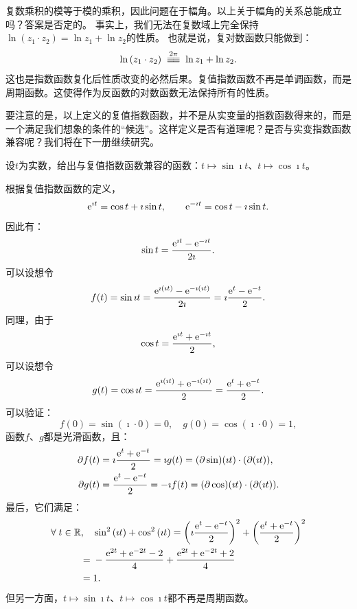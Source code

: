 \documentclass[12pt,UTF8,fontset=none]{ctexbook}
\begin{document}
复数乘积的模等于模的乘积，因此问题在于幅角。以上关于幅角的关系总能成立吗？答案是否定的。
事实上，我们无法在复数域上完全保持$\ln{(z_1 \cdot z_2)} = \ln{z_1} + \ln{z_2}$的性质。
也就是说，复对数函数只能做到：
$$ \ln{(z_1 \cdot z_2)} \tong{2\pi} \ln{z_1} + \ln{z_2} . $$
这也是指数函数复化后性质改变的必然后果。复值指数函数不再是单调函数，而是周期函数。这使得作为反函数的对数函数无法保持所有的性质。

要注意的是，以上定义的复值指数函数，并不是从实变量的指数函数得来的，而是一个满足我们想象的条件的“候选”。这样定义是否有道理呢？是否与实变指数函数兼容呢？我们将在下一册继续研究。

\begin{et}
    设$t$为实数，给出与复值指数函数兼容的函数：$t\mapsto \sin{\imath t}$、$t\mapsto \cos{\imath t}$。
\end{et}

\begin{so}
    根据复值指数函数的定义，
    $$ \mathrm{e}^{\imath t} = \cos{t} + \imath \sin{t}, \qquad \mathrm{e}^{-\imath t} = \cos{t} - \imath \sin{t}. $$
    因此有：
    $$ \sin{t} = \frac{\mathrm{e}^{\imath t} - \mathrm{e}^{-\imath t}}{2\imath}.$$
    可以设想令
    $$ f(t) = \sin{\imath t} = \frac{\mathrm{e}^{\imath (\imath t)} - \mathrm{e}^{-\imath (\imath t)}}{2\imath} = \imath \frac{\mathrm{e}^{t} - \mathrm{e}^{-t}}{2}.$$
    同理，由于
    $$ \cos{t} = \frac{\mathrm{e}^{\imath t} + \mathrm{e}^{-\imath t}}{2},$$
    可以设想令
    $$ g(t) = \cos{\imath t} = \frac{\mathrm{e}^{\imath (\imath t)} + \mathrm{e}^{-\imath (\imath t)}}{2} = \frac{\mathrm{e}^{t} + \mathrm{e}^{-t}}{2}.$$
    可以验证：
    $$ f(0) = \sin{(\imath \cdot 0)} = 0, \quad g(0)=\cos{(\imath \cdot 0)} = 1,$$
    函数$f$、$g$都是光滑函数，且：
    \begin{align*}
        \partial f(t) &= \imath \frac{\mathrm{e}^{t} + \mathrm{e}^{-t}}{2} = \imath g(t) = (\partial\sin)(\imath t)\cdot (\partial(\imath t)), \\
        \partial g(t) &= \frac{\mathrm{e}^{t} - \mathrm{e}^{-t}}{2} = -\imath f(t) = (\partial\cos)(\imath t)\cdot (\partial(\imath t)).
    \end{align*}
    最后，它们满足：
    \begin{align*}
        \forall \; t\in \mathbb{R}, \quad & \sin^2{(\imath t)} + \cos^2{(\imath t)} = \left(\imath \frac{\mathrm{e}^{t} - \mathrm{e}^{-t}}{2}\right)^2 + \left( \frac{\mathrm{e}^{t} + \mathrm{e}^{-t}}{2}\right)^2 \\
        =\;& -\frac{\mathrm{e}^{2t} + \mathrm{e}^{-2t} - 2}{4} + \frac{\mathrm{e}^{2t} + \mathrm{e}^{-2t} + 2}{4} \\
        =\;& 1.
    \end{align*}
    但另一方面，$t\mapsto \sin{\imath t}$、$t\mapsto \cos{\imath t}$都不再是周期函数。

\end{so}
\end{document}
